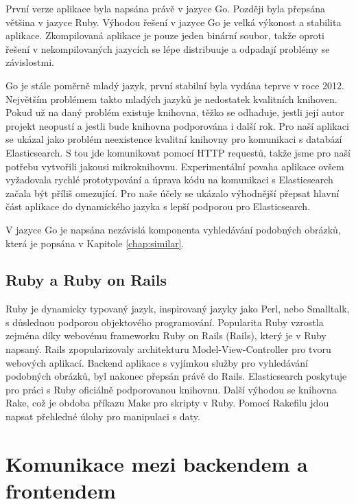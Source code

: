 První verze aplikace byla napsána právě v jazyce Go. Později byla přepsána většina v jazyce Ruby. Výhodou řešení v jazyce Go je velká výkonost a stabilita aplikace. Zkompilovaná aplikace je pouze jeden binární soubor, takže oproti řešení v nekompilovaných jazycích se lépe distribuuje a odpadají problémy se závislostmi.

Go je stále poměrně mladý jazyk, první stabilní byla vydána teprve v roce 2012\cite{golang-release}. Největším problémem takto mladých jazyků je nedostatek kvalitních knihoven. Pokud už na daný problém existuje knihovna, těžko se odhaduje, jestli její autor projekt neopustí a jestli bude knihovna podporována i další rok. Pro naší aplikaci se ukázal jako problém neexistence kvalitní knihovny pro komunikaci s databází Elasticsearch. S tou jde komunikovat pomocí HTTP requestů, takže jsme pro naší potřebu vytvořili jakousi mikroknihovnu. Experimentální povaha aplikace ovšem vyžadovala rychlé prototypování a úprava kódu na komunikaci s Elasticsearch začala být příliš omezující. Pro naše účely se ukázalo výhodnější přepsat hlavní část aplikace do dynamického jazyka s lepší podporou pro Elasticsearch.

V jazyce Go je napsána nezávislá komponenta vyhledávání podobných obrázků, která je popsána v Kapitole \ref{chap:similar}.

\subsection{Ruby a Ruby on Rails}

Ruby\cite{ruby} je dynamicky typovaný jazyk, inspirovaný jazyky jako Perl, nebo Smalltalk, s důslednou podporou objektového programování. Popularita Ruby vzrostla zejména díky webovému frameworku Ruby on Rails (Rails)\cite{rails}, který je v Ruby napsaný. Rails zpopularizovaly architekturu Model-View-Controller\cite{mvc} pro tvoru webových aplikací. Backend aplikace s vyjímkou služby pro vyhledávání podobných obrázků, byl nakonec přepsán právě do Rails. Elasticsearch poskytuje pro práci s Ruby oficiálně podporovanou knihovnu\cite{elasticsearch-ruby}. Další výhodou se knihovna Rake, což je obdoba příkazu Make pro skripty v Ruby. Pomocí Rakefilu jdou napsat přehledné úlohy pro manipulaci s daty. 

\section{Komunikace mezi backendem a frontendem}

